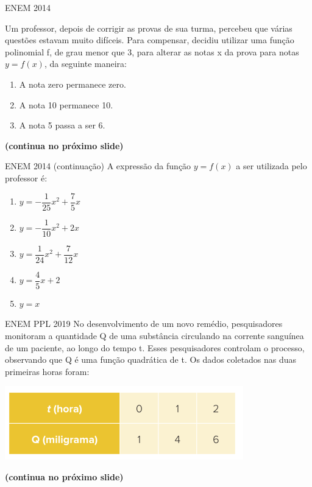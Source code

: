 \documentclass[11pt]{beamer}
\newif\ifgab
\newcommand{\gab}[1]{%
  \ifgab
    \textcolor{red!80!black}{\textbf{#1}}%
  \else
    #1%
  \fi
}
\begin{document}
\begin{frame}{ENEM 2014}

    Um professor, depois de corrigir as provas de sua turma, percebeu que várias questões estavam muito difíceis. Para compensar, decidiu utilizar uma função polinomial f, de grau menor que 3, para alterar as notas x da prova para notas $y = f(x)$, da seguinte maneira:

    \begin{enumerate}[I]
        \item A nota zero permanece zero.
        \item A nota 10 permanece 10.
        \item A nota 5 passa a ser 6.
    \end{enumerate}

    \vfill
    \textbf{(continua no próximo slide)}
    
\end{frame}

\begin{frame}{ENEM 2014 (continuação)}
    A expressão da função $y = f(x)$ a ser utilizada pelo professor é:

    \begin{enumerate}[a]
        \item \gab{$y=-\dfrac{1}{25}x^{2}+\dfrac{7}{5}x$} %
        \item $y=-\dfrac{1}{10}x^{2}+2x$ \\
        \item $y=\dfrac{1}{24}x^{2}+\dfrac{7}{12}x$ \\
        \item $y=\dfrac{4}{5}x+2$ \\
        \item $y=x$ 
    \end{enumerate}
    
\end{frame}

\begin{frame}{ENEM PPL 2019}
    No desenvolvimento de um novo remédio, pesquisadores monitoram a quantidade Q de uma substância circulando na corrente sanguínea de um paciente, ao longo do tempo t. Esses pesquisadores controlam o processo, observando que Q é uma função quadrática de t. Os dados coletados nas duas primeiras horas foram:

    \begin{center}
        \includegraphics[scale=0.5]{imagens/enem-ppl-2019.png}
    \end{center} \textbf{(continua no próximo slide)}
\end{frame}
\end{document}
